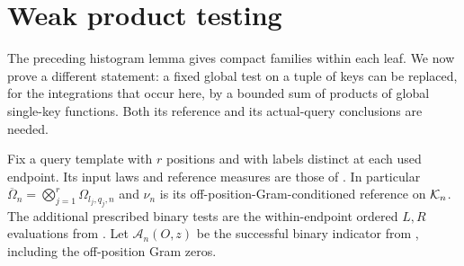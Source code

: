 \section{Weak product testing}\label{sec:product-tests}

The preceding histogram lemma gives compact families within each
leaf. We now prove a different statement: a fixed global test on a
tuple of keys can be replaced, for the integrations that occur here,
by a bounded sum of products of global single-key functions. Both its
reference and its actual-query conclusions are needed.

Fix a query template with $r$ positions and with labels distinct at
each used endpoint. Its input laws and reference measures are those
of . In particular
$\overline\Omega_n=\bigotimes_{j=1}^r\Omega_{l_j,q_j,n}$ and
$\nu_n$ is its off-position-Gram-conditioned reference on $\mathcal K_n$.
The additional prescribed binary tests are the within-endpoint
ordered $L,R$ evaluations from . Let
$\mathcal A_n(O,z)$ be the successful binary indicator from
, including the off-position Gram zeros.

